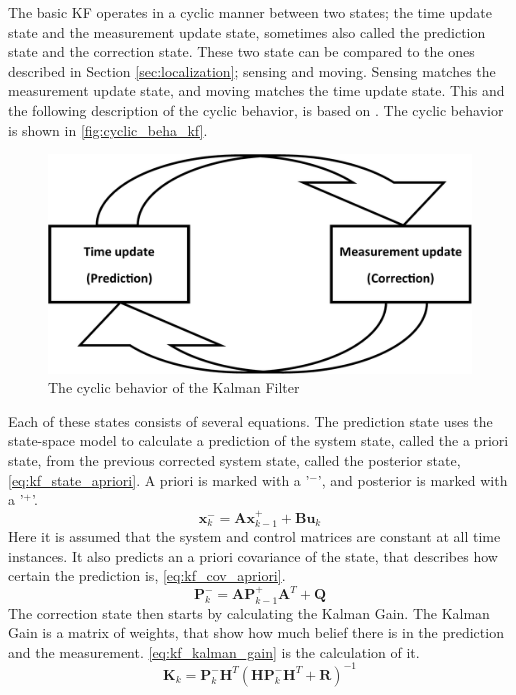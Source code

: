 \documentclass[Main]{subfiles}
\begin{document}
The basic KF operates in a cyclic manner between two states; the time update state and the measurement update state, sometimes also called the prediction state and the correction state. 
These two state can be compared to the ones described in Section \ref{sec:localization}; sensing and moving.
Sensing matches the measurement update state, and moving matches the time update state.
This and the following description of the cyclic behavior, is based on \cite{Simon2006}.
The cyclic behavior is shown in \autoref{fig:cyclic_beha_kf}.
\begin{figure}[H]
	\centering
	\includegraphics[width=0.5\linewidth]{./Figures/kf_states.png}
	\caption{The cyclic behavior of the Kalman Filter}
	\label{fig:cyclic_beha_kf}
\end{figure}\noindent
Each of these states consists of several equations. 
The prediction state uses the state-space model to calculate a prediction of the system state, called the a priori state, from the previous corrected system state, called the posterior state, \autoref{eq:kf_state_apriori}.
A priori is marked with a '$^-$', and posterior is marked with a '$^+$'.
\begin{equation}
\label{eq:kf_state_apriori}
\mathbf{x}_k^-=\mathbf{A} \mathbf{x}_{k-1}^+ + \mathbf{B} \mathbf{u}_k
\end{equation}
Here it is assumed that the system and control matrices are constant at all time instances.
It also predicts an a priori covariance of the state, that describes how certain the prediction is, \autoref{eq:kf_cov_apriori}.
\begin{equation}
\label{eq:kf_cov_apriori}
\mathbf{P}_k^-=\mathbf{A} \mathbf{P}_{k-1}^+ \mathbf{A}^T+\mathbf{Q}
\end{equation}
The correction state then starts by calculating the Kalman Gain. 
The Kalman Gain is a matrix of weights, that show how much belief there is in the prediction and the measurement. \autoref{eq:kf_kalman_gain} is the calculation of it.
\begin{equation}
\label{eq:kf_kalman_gain}
\mathbf{K}_k = \mathbf{P}_k^- \mathbf{H}^T (\mathbf{H} \mathbf{P}_k^- \mathbf{H}^T + \mathbf{R})^{-1}
\end{equation}
\end{document}
